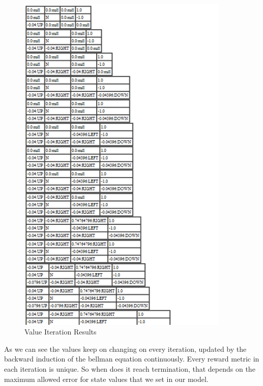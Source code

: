 \begin{figure}[hb]
    \label{fig:ValueIterationResults}
    \begin{center}
        \includegraphics[width=0.90\textwidth]{Figures/Planning_Figure_2.png}
        \caption{Value Iteration Results}
    \end{center}
\end{figure}

As we can see the values keep on changing on every iteration, updated by the
backward induction of the bellman equation continuously. Every reward metric in
each iteration is unique. So when does it reach termination, that depends on the
maximum allowed error for state values that we set in our model. 

